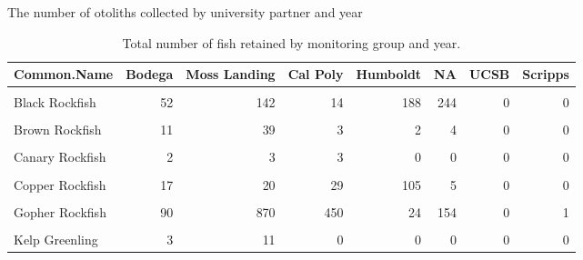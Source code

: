 \documentclass[
]{article}
\begin{document}
The number of otoliths collected by university partner and year

\FloatBarrier

\begin{table}

\caption{\label{tab:otoliths}Total number of fish retained by monitoring group and year.}
\centering
\begin{tabular}[t]{lrrrrrrr}
\toprule
Common.Name & Bodega & Moss Landing & Cal Poly & Humboldt & NA & UCSB & Scripps\\
\midrule
\cellcolor{gray!6}{Black-and-Yellow Rockfish} & \cellcolor{gray!6}{4} & \cellcolor{gray!6}{6} & \cellcolor{gray!6}{15} & \cellcolor{gray!6}{0} & \cellcolor{gray!6}{0} & \cellcolor{gray!6}{0} & \cellcolor{gray!6}{0}\\
Black Rockfish & 52 & 142 & 14 & 188 & 244 & 0 & 0\\
\cellcolor{gray!6}{Blue Rockfish} & \cellcolor{gray!6}{54} & \cellcolor{gray!6}{316} & \cellcolor{gray!6}{183} & \cellcolor{gray!6}{161} & \cellcolor{gray!6}{69} & \cellcolor{gray!6}{1} & \cellcolor{gray!6}{0}\\
Brown Rockfish & 11 & 39 & 3 & 2 & 4 & 0 & 0\\
\cellcolor{gray!6}{California Scorpionfish} & \cellcolor{gray!6}{0} & \cellcolor{gray!6}{0} & \cellcolor{gray!6}{0} & \cellcolor{gray!6}{0} & \cellcolor{gray!6}{0} & \cellcolor{gray!6}{0} & \cellcolor{gray!6}{1}\\
\addlinespace
Canary Rockfish & 2 & 3 & 3 & 0 & 0 & 0 & 0\\
\cellcolor{gray!6}{China Rockfish} & \cellcolor{gray!6}{48} & \cellcolor{gray!6}{38} & \cellcolor{gray!6}{3} & \cellcolor{gray!6}{70} & \cellcolor{gray!6}{31} & \cellcolor{gray!6}{0} & \cellcolor{gray!6}{0}\\
Copper Rockfish & 17 & 20 & 29 & 105 & 5 & 0 & 0\\
\cellcolor{gray!6}{Deacon Rockfish} & \cellcolor{gray!6}{59} & \cellcolor{gray!6}{64} & \cellcolor{gray!6}{2} & \cellcolor{gray!6}{133} & \cellcolor{gray!6}{58} & \cellcolor{gray!6}{0} & \cellcolor{gray!6}{0}\\
Gopher Rockfish & 90 & 870 & 450 & 24 & 154 & 0 & 1\\
\addlinespace
\cellcolor{gray!6}{Honeycomb Rockfish} & \cellcolor{gray!6}{0} & \cellcolor{gray!6}{0} & \cellcolor{gray!6}{0} & \cellcolor{gray!6}{0} & \cellcolor{gray!6}{0} & \cellcolor{gray!6}{0} & \cellcolor{gray!6}{1}\\
Kelp Greenling & 3 & 11 & 0 & 0 & 0 & 0 & 0\\

\end{tabular}
\end{table}
\end{document}
